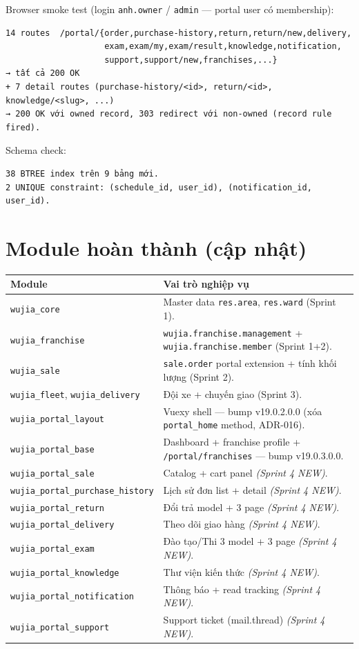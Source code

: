 Browser smoke test (login \texttt{anh.owner} / \texttt{admin} --- portal user có membership):

\begin{lstlisting}[style=shell]
14 routes  /portal/{order,purchase-history,return,return/new,delivery,
                    exam,exam/my,exam/result,knowledge,notification,
                    support,support/new,franchises,...}
→ tất cả 200 OK
+ 7 detail routes (purchase-history/<id>, return/<id>, knowledge/<slug>, ...)
→ 200 OK với owned record, 303 redirect với non-owned (record rule fired).
\end{lstlisting}

Schema check:

\begin{lstlisting}[style=shell]
38 BTREE index trên 9 bảng mới.
2 UNIQUE constraint: (schedule_id, user_id), (notification_id, user_id).
\end{lstlisting}

\section{Module hoàn thành (cập nhật)}

\begin{longtable}{p{4cm} p{10cm}}
\toprule
\textbf{Module} & \textbf{Vai trò nghiệp vụ} \\
\midrule
\endhead
\texttt{wujia\_core} & Master data \texttt{res.area}, \texttt{res.ward} (Sprint 1). \\
\texttt{wujia\_franchise} & \texttt{wujia.franchise.management} + \texttt{wujia.franchise.member} (Sprint 1+2). \\
\texttt{wujia\_sale} & \texttt{sale.order} portal extension + tính khối lượng (Sprint 2). \\
\texttt{wujia\_fleet}, \texttt{wujia\_delivery} & Đội xe + chuyến giao (Sprint 3). \\
\texttt{wujia\_portal\_layout} & Vuexy shell --- bump v19.0.2.0.0 (xóa \texttt{portal\_home} method, ADR-016). \\
\texttt{wujia\_portal\_base} & Dashboard + franchise profile + \texttt{/portal/franchises} --- bump v19.0.3.0.0. \\
\texttt{wujia\_portal\_sale} & Catalog + cart panel \emph{(Sprint 4 NEW)}. \\
\texttt{wujia\_portal\_purchase\_history} & Lịch sử đơn list + detail \emph{(Sprint 4 NEW)}. \\
\texttt{wujia\_portal\_return} & Đổi trả model + 3 page \emph{(Sprint 4 NEW)}. \\
\texttt{wujia\_portal\_delivery} & Theo dõi giao hàng \emph{(Sprint 4 NEW)}. \\
\texttt{wujia\_portal\_exam} & Đào tạo/Thi 3 model + 3 page \emph{(Sprint 4 NEW)}. \\
\texttt{wujia\_portal\_knowledge} & Thư viện kiến thức \emph{(Sprint 4 NEW)}. \\
\texttt{wujia\_portal\_notification} & Thông báo + read tracking \emph{(Sprint 4 NEW)}. \\
\texttt{wujia\_portal\_support} & Support ticket (mail.thread) \emph{(Sprint 4 NEW)}. \\
\bottomrule
\end{longtable}

